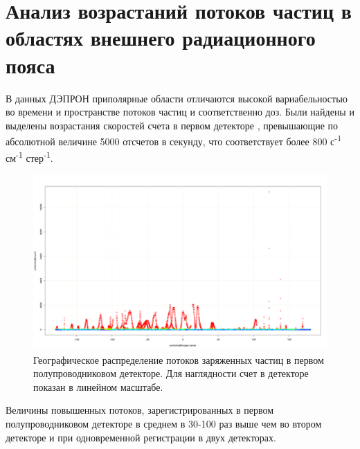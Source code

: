 \section{Анализ возрастаний потоков частиц в областях внешнего радиационного пояса}\label{sec:flash_analisys}
В  данных  ДЭПРОН приполярные области отличаются высокой вариабельностью во времени и пространстве потоков частиц и соответственно доз. Были найдены и выделены возрастания скоростей счета в первом детекторе	\label{fig:depronlatmap148}, превышающие по абсолютной величине 5000 отсчетов в секунду, что соответствует более 800 с\textsuperscript{-1} см\textsuperscript{-1} стер\textsuperscript{-1}. 
\begin{figure}[h]
	\centering
	\includegraphics[width=0.8\linewidth]{images/Flash/depron_lat_map_148}
	\caption{Географическое распределение потоков заряженных частиц в первом полупроводниковом детекторе. Для наглядности счет в детекторе показан в линейном масштабе.}
	\label{fig:depronlatmap148}
\end{figure}
Величины повышенных потоков, зарегистрированных в первом полупроводниковом детекторе в среднем в 30-100 раз выше чем во втором детекторе и при одновременной регистрации в двух детекторах.
